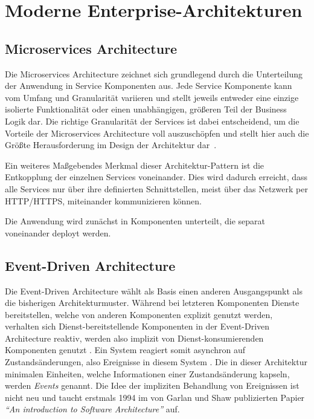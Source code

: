\documentclass[acmtog]{acmart}
\begin{document}
    \section{Moderne Enterprise-Architekturen}

    \subsection{Microservices Architecture}\label{subsec:microservices}
    Die Microservices Architecture zeichnet sich grundlegend durch die Unterteilung der Anwendung in Service Komponenten aus.
    Jede Service Komponente kann vom Umfang und Granularität variieren und stellt jeweils entweder eine einzige isolierte Funktionalität
    oder einen unabhängigen, größeren Teil der Business Logik dar.
    Die richtige Granularität der Services ist dabei entscheidend, um die Vorteile der Microservices Architecture voll auszuschöpfen und stellt hier auch die Größte Herausforderung im Design der Architektur dar~\cite[27-28]{architecturePatterns}.

    Ein weiteres Maßgebendes Merkmal dieser Architektur-Pattern ist die Entkopplung der einzelnen Services voneinander.
    Dies wird dadurch erreicht, dass alle Services nur über ihre definierten Schnittstellen, meist über das Netzwerk per HTTP/HTTPS, miteinander kommunizieren können.


    Die Anwendung wird zunächst in Komponenten unterteilt, die separat voneinander deployt werden.

    \subsection{Event-Driven Architecture}
    Die Event-Driven Architecture wählt als Basis einen anderen Ausgangspunkt als die bisherigen Architekturmuster.
    Während bei letzteren Komponenten Dienste bereitstellen, welche von anderen Komponenten explizit genutzt werden,
    verhalten sich Dienst-bereitstellende Komponenten in der Event-Driven Architecture reaktiv,
    werden also implizit von Dienst-konsumierenden Komponenten genutzt \cite{garlanShawImplizit}.
    Ein System reagiert somit asynchron auf Zustandsänderungen, also Ereignisse in diesem System \cite{eda}.
    Die in dieser Architektur minimalen Einheiten, welche Informationen einer Zustandsänderung kapseln, werden \textit{Events} genannt.
    Die Idee der impliziten Behandlung von Ereignissen ist nicht neu und taucht erstmals 1994 im von Garlan und Shaw publizierten Papier
    \textit{\enquote{An introduction to Software Architecture}} auf.
\end{document}
